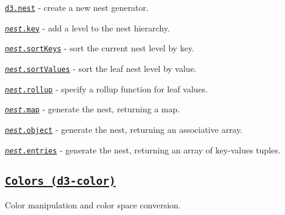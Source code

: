 \begin{DoxyItemize}
\item \href{https://github.com/d3/d3-collection/blob/master/README.md#nest}{\tt d3.\+nest} -\/ create a new nest generator.
\item \href{https://github.com/d3/d3-collection/blob/master/README.md#nest_key}{\tt {\itshape nest}.key} -\/ add a level to the nest hierarchy.
\item \href{https://github.com/d3/d3-collection/blob/master/README.md#nest_sortKeys}{\tt {\itshape nest}.sort\+Keys} -\/ sort the current nest level by key.
\item \href{https://github.com/d3/d3-collection/blob/master/README.md#nest_sortValues}{\tt {\itshape nest}.sort\+Values} -\/ sort the leaf nest level by value.
\item \href{https://github.com/d3/d3-collection/blob/master/README.md#nest_rollup}{\tt {\itshape nest}.rollup} -\/ specify a rollup function for leaf values.
\item \href{https://github.com/d3/d3-collection/blob/master/README.md#nest_map}{\tt {\itshape nest}.map} -\/ generate the nest, returning a map.
\item \href{https://github.com/d3/d3-collection/blob/master/README.md#nest_object}{\tt {\itshape nest}.object} -\/ generate the nest, returning an associative array.
\item \href{https://github.com/d3/d3-collection/blob/master/README.md#nest_entries}{\tt {\itshape nest}.entries} -\/ generate the nest, returning an array of key-\/values tuples.
\end{DoxyItemize}

\subsection*{\href{https://github.com/d3/d3-color}{\tt Colors (d3-\/color)}}

Color manipulation and color space conversion.


